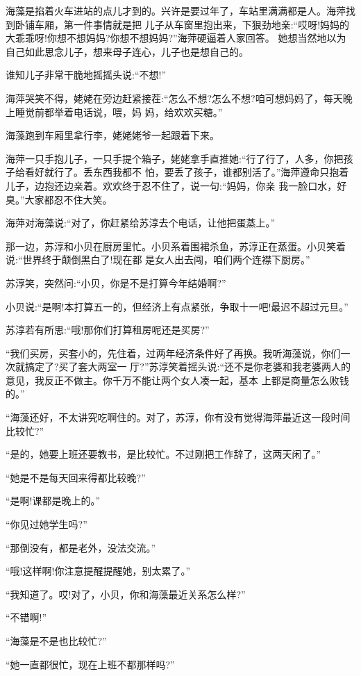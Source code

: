 \documentclass[11pt,a4paper,onecolumn]{article}
\begin{document}
海藻是掐着火车进站的点儿才到的。兴许是要过年了，车站里满满都是人。海萍找到卧铺车厢，第一件事情就是把
儿子从车窗里抱出来，下狠劲地亲:``哎呀!妈妈的大乖乖呀!你想不想妈妈?你想不想妈妈?''海萍硬逼着人家回答。
她想当然地以为自己如此思念儿子，想来母子连心，儿子也是想自己的。

谁知儿子非常干脆地摇摇头说:``不想!''

海萍哭笑不得，姥姥在旁边赶紧接茬:``怎么不想?怎么不想?咱可想妈妈了，每天晚上睡觉前都举着电话说，喂，妈
妈，给欢欢买糖。''

海藻跑到车厢里拿行李，姥姥姥爷一起跟着下来。

海萍一只手抱儿子，一只手提个箱子，姥姥拿手直推她:``行了行了，人多，你把孩子给看好就行了。丢东西我都不
怕，要丢了孩子，谁都别活了。''海萍遵命只抱着儿子，边抱还边亲着。欢欢终于忍不住了，说一句:``妈妈，你亲
我一脸口水，好臭。''大家都忍不住大笑。

海萍对海藻说:``对了，你赶紧给苏淳去个电话，让他把蛋蒸上。''

那一边，苏淳和小贝在厨房里忙。小贝系着围裙杀鱼，苏淳正在蒸蛋。小贝笑着说:``世界终于颠倒黑白了!现在都
是女人出去闯，咱们两个连襟下厨房。''

苏淳笑，突然问:``小贝，你是不是打算今年结婚啊?''

小贝说:``是啊!本打算五一的，但经济上有点紧张，争取十一吧!最迟不超过元旦。''

苏淳若有所思:``哦!那你们打算租房呢还是买房?''

``我们买房，买套小的，先住着，过两年经济条件好了再换。我听海藻说，你们一次就搞定了?买了套大两室一
厅?''苏淳笑着摇头说:``还不是你老婆和我老婆两人的意见，我反正不做主。你千万不能让两个女人凑一起，基本
上都是商量怎么败钱的。''

``海藻还好，不太讲究吃啊住的。对了，苏淳，你有没有觉得海萍最近这一段时间比较忙?''

``是的，她要上班还要教书，是比较忙。不过刚把工作辞了，这两天闲了。''

``她是不是每天回来得都比较晚?''

``是啊!课都是晚上的。''

``你见过她学生吗?''

``那倒没有，都是老外，没法交流。''

``哦!这样啊!你注意提醒提醒她，别太累了。''

``我知道了。哎!对了，小贝，你和海藻最近关系怎么样?''

``不错啊!''

``海藻是不是也比较忙?''

``她一直都很忙，现在上班不都那样吗?''
\end{document}
